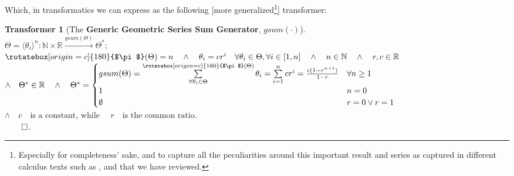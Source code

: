 \documentclass[a4paper, 18pt]{book} %
\newtheorem{transf}{Transformer}
\newcommand{\invpi}{\rotatebox[origin=c]{180}{$\pi$}}
\begin{document}
\begin{appendices}
\vspace{2em}

Which, in transformatics we can express as the following [more generalized\footnote{Especially for completeness' sake, and to capture all the peculiarities around this important result and series as captured in different calculus texts such as \cite{ronlarsoncalculus},  \cite{fitzpatrick1995advanced} and \cite{Grossman1986CalculusOneVariable} that we have reviewed.}] transformer:


\vspace{2em}

\begin{transf}[The \textbf{Generic Geometric Series Sum Generator}, $gsum(\cdot)$]
\label{TRANSFGEOSERIES}
$ $\\
$\Theta = \langle \theta_i \rangle^n : \mathbb{N} \times \mathbb{R} \xrightarrow{gsum(\Theta)} \Theta^*;$\\
$\invpi(\Theta) = n \quad \land \quad \theta_i = cr^i \quad \forall \theta_i \in \Theta, \forall i \in [1,n] \quad \land \quad n \in \mathbb{N} \quad \land \quad r,c \in \mathbb{R}$\\
$\land \quad \Theta^* \in \mathbb{R} \quad \land \quad \Theta^* = \begin{cases}
gsum(\Theta) =  \sum\limits^{\invpi(\Theta)}_{\forall \theta_i \in \Theta} \theta_i = \sum\limits^n_{i=1} cr^i   = \frac{c(1 - r^{n+1})}{1 - r} & \forall n \geq 1 \\
1 & n = 0\\
\emptyset & r = 0 \lor r = 1
\end{cases}$\\
$\land \quad  c \quad \text{is a constant, while } \quad r \quad \text{is the common ratio.}$\\
$\qed$.
\end{transf}
 
 

\vspace{2em}



\end{appendices}
\end{document}
